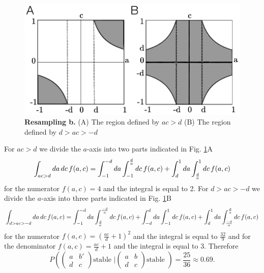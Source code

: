 \documentclass{amsart}
\theoremstyle{definition}
\theoremstyle{remark}
\numberwithin{equation}{section}
\begin{document}
\begin{figure}[!ht]
\centering
\noindent\includegraphics[width=0.5\columnwidth]{fig/2x2-resample-b.pdf}
\caption{{\bf Resampling b.} (A) The region defined by $ac > d$ (B) The region defined by $d > ac > -d$}
\label{fig:2x2-resample-b}
\end{figure}

For $ac > d$ we divide the $a$-axis into two parts indicated in Fig. \ref{fig:2x2-resample-b}A
$$
\int_{ac>d} da\,dc \, f(a,c) = \int_{-1}^{-d} da \int_{-1}^{d \over a} dc \, f(a,c) + \int_{d}^{1} da \int_{d \over a}^1 dc \, f(a,c)$$
for the numerator $f(a,c) = 4$ and the integral is equal to 2. For $d > ac > -d$ we divide the $a$-axis into three parts indicated in Fig. \ref{fig:2x2-resample-b}B
$$
\int_{d > ac > -d} da\,dc \, f(a,c) = \int_{-1}^{-d} da \int_{d \over a}^{- d \over a} dc \, f(a,c) + \int_{-d}^{d} da \int_{-1}^{1} dc \, f(a,c) + \int_{d}^{1} da \int_{-d \over a}^{d \over a} dc \, f(a,c)
$$
for the numerator $f(a,c) = (\frac{ac}{d} + 1)^2$ and the integral is equal to $\frac{32}{9}$ and for the denominator $f(a,c) = \frac{ac}{d} + 1$ and the integral is equal to $3$. Therefore
$$P\left(\begin{pmatrix}
a & b' \\
d & c
\end{pmatrix} \textrm{stable } \bigg| \begin{pmatrix}
a & b \\
d & c
\end{pmatrix} \textrm{stable } \right) = \frac{25}{36} \approx 0.69.$$

\end{document}

